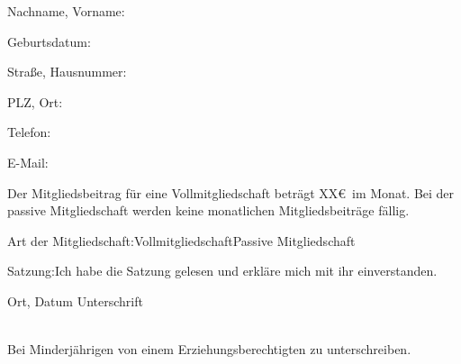 \documentclass[ngerman]{scrartcl}
\newcommand{\smallSquare}{\fbox{\phantom{\rule{0.15in}{0.15in}}}}
\begin{document}
\vspace{6ex}

\noindent{}

\vspace{6ex}

Nachname, Vorname:\hspace{2ex}\uline{
\phantom{xxxxxxxxxxxxxxxxxxx}
\hfill\phantom{x}}

\vspace{4ex}

Geburtsdatum:\hspace{2ex}\uline{
\phantom{xxxxxxxxxxxxxxxxxxx}
\hfill\phantom{x}}

\vspace{4ex}

Stra\ss{}e, Hausnummer:\hspace{2ex}\uline{
\phantom{xxxxxxxxxxxxxxxxxxx}
\hfill\phantom{x}}

\vspace{4ex}

PLZ, Ort:\hspace{2ex}\uline{
\phantom{xxxxxxxxxxxxxxxxxxx}
\hfill\phantom{x}}

\vspace{4ex}

Telefon:\hspace{2ex}\uline{
\phantom{xxxxxxxxxxxxxxxxxxx}
\hfill\phantom{x}}

\vspace{4ex}

E-Mail:\hspace{2ex}\uline{
\phantom{xxxxxxxxxxxxxxxxxxx}
\hfill\phantom{x}}

\vspace{4ex}

\begin{center}
Der Mitgliedsbeitrag f\"ur eine Vollmitgliedschaft betr\"agt XX\euro\ im Monat. Bei der passive Mitgliedschaft werden keine monatlichen Mitgliedsbeitr\"age f\"allig.
\end{center}

\vspace{2ex}

Art der Mitgliedschaft:\hspace{2ex}\smallSquare\hspace{2ex}Vollmitgliedschaft\hspace{6ex}\smallSquare\hspace{2ex}Passive Mitgliedschaft

\vspace{4ex}
Satzung:\hspace{4ex}\smallSquare\hspace{2ex}Ich habe die Satzung gelesen und erkl\"are mich mit ihr einverstanden.

\vspace{24ex}

Ort, Datum \uline{\hfill}  Unterschrift \uline{\phantom{xxxxxxxxxxxxxxxxxxxxxxxxxxxxxxxxxx}}\\
\phantom{xxxxxxxxxxxxxxxxxxxxxxxxx}\\
\begin{center}\small{Bei Minderj\"ahrigen von einem Erziehungsberechtigten zu unterschreiben.}\end{center}
\end{document}
